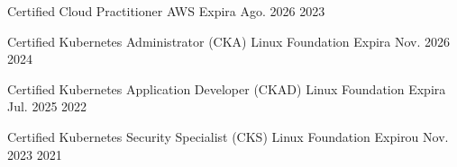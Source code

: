 \begin{cvhonors}

  \cvhonor
    {Certified Cloud Practitioner}
    {AWS}
    {Expira Ago. 2026}
    {2023}
    
  \cvhonor
    {Certified Kubernetes Administrator (CKA)}
    {Linux Foundation}
    {Expira Nov. 2026}
    {2024}
    

  \cvhonor
    {Certified Kubernetes Application Developer (CKAD)}
    {Linux Foundation}
    {Expira Jul. 2025}
    {2022}

  \cvhonor
    {Certified Kubernetes Security Specialist (CKS)}
    {Linux Foundation}
    {Expirou Nov. 2023}
    {2021}

\end{cvhonors}